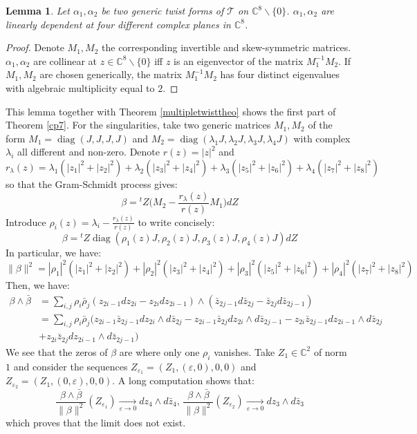 \documentclass[12pt, reqno]{amsart}
\newtheorem{lemma}[Def]{Lemma}
\DeclareMathOperator\diag{diag}
\newcommand{\C}{\mathbb{C}}
\begin{document}
\begin{lemma}
    Let $\alpha_1,\alpha_2$ be two generic twist forms of $\mathcal{T}$ on $\C^8\backslash\{0\}$. $\alpha_1,\alpha_2$ are linearly dependent at four different complex planes in $\C^8$.
\end{lemma}
\begin{proof}
    Denote $M_1,M_2$ the corresponding invertible and skew-symmetric matrices. $\alpha_1,\alpha_2$ are collinear at $z\in\C^8\backslash\{0\}$ iff $z$ is an eigenvector of the matrix $M_1^{-1}M_2$. If $M_1,M_2$ are chosen generically, the matrix $M_1^{-1}M_2$ has four distinct eigenvalues with algebraic multiplicity equal to $2$.
\end{proof}
This lemma together with Theorem \ref{multipletwisttheo} shows the first part of Theorem \ref{cp7}. For the singularities, take two generic matrices $M_1,M_2$ of the form $M_1=\diag(J,J,J,J)$ and $M_2=\diag(\lambda_1J,\lambda_2J,\lambda_3J,\lambda_4J)$ with complex $\lambda_i$ all different and non-zero. Denote $r(z)=|z|^2$ and $r_\lambda(z)=\lambda_1(|z_1|^2+|z_2|^2)+\lambda_2(|z_3|^2+|z_4|^2)+\lambda_3(|z_5|^2+|z_6|^2)+\lambda_4(|z_7|^2+|z_8|^2)$ so that the Gram-Schmidt process gives:\[\beta={}^tZ\bigg(M_2-\frac{r_\lambda(z)}{r(z)}M_1\bigg)dZ\] Introduce $\rho_i(z)=\lambda_i-\frac{r_\lambda(z)}{r(z)}$ to write concisely:\[\beta={}^tZ\diag(\rho_1(z)J,\rho_2(z)J,\rho_3(z)J,\rho_4(z)J)dZ\] In particular, we have:
\[\|\beta\|^2=|\rho_1|^2(|z_1|^2+|z_2|^2)+|\rho_2|^2(|z_3|^2+|z_4|^2)+|\rho_3|^2(|z_5|^2+|z_6|^2)+|\rho_4|^2(|z_7|^2+|z_8|^2) \] Then, we have:
\begin{align*}
    \beta\wedge\bar\beta&=\sum_{i,j}\rho_i\bar\rho_j(z_{2i-1}dz_{2i}-z_{2i}dz_{2i-1})\wedge(\bar z_{2j-1}d\bar z_{2j}-\bar z_{2j}d\bar z_{2j-1})\\&=\sum_{i,j}\rho_i\bar\rho_j(z_{2i-1}\bar z_{2j-1}dz_{2i}\wedge d\bar z_{2j}-z_{2i-1}\bar z_{2j} dz_{2i}\wedge d\bar z_{2j-1}-z_{2i}\bar z_{2j-1}dz_{2i-1}\wedge d\bar z_{2j}\\&+z_{2i}\bar z_{2j}dz_{2i-1}\wedge d\bar z_{2j-1})     
\end{align*} We see that the zeros of $\beta$ are where only one $\rho_i$ vanishes.
Take $Z_1\in\C^2$ of norm $1$ and consider the sequences $Z_{\varepsilon_1}=(Z_1,(\varepsilon,0),0,0)$ and $Z_{\varepsilon_2}=(Z_1,(0,\varepsilon),0,0)$. A long computation shows that:
\[\frac{\beta\wedge\bar\beta}{\|\beta\|^2}(Z_{\varepsilon_1})\underset{\varepsilon\to 0}{\to}dz_4\wedge d\bar z_4,\,\frac{\beta\wedge\bar\beta}{\|\beta\|^2}(Z_{\varepsilon_2})\underset{\varepsilon\to 0}{\to}dz_3\wedge d\bar z_3\] which proves that the limit does not exist. 
\end{document}
